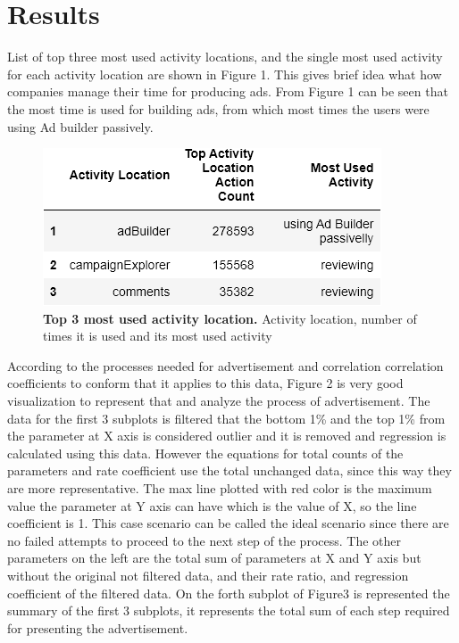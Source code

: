 \documentclass[fleqn,moreauthors,10pt]{ds_report}
\begin{document}

\section*{Results}
\FloatBarrier

List of top three most used activity locations, and the single most used activity for each activity location are shown in Figure 1. This gives brief idea what how companies manage their time for producing ads. From Figure 1 can be seen that the most time is used for building ads, from which most times the users were using Ad builder passively. %
\begin{figure}\centering
	\includegraphics[width=\linewidth]{mostUsedActivityLocTable.png}
	\caption{\textbf{Top 3 most used activity location.} Activity location, number of times it is used and its most used activity}
	\label{fig:column}
\end{figure}
\FloatBarrier
According to the processes needed for advertisement and correlation correlation coefficients to conform that it applies to this data, Figure 2 is very good visualization to represent that and analyze the process of advertisement. The data for the first 3 subplots is filtered that the bottom 1\% and the top 1\%  from the parameter at X axis is considered outlier and it is removed and regression is calculated using this data. However the equations for total counts of the parameters and rate coefficient use the total unchanged data, since this way they are more representative. The max line plotted with red color is the maximum value the parameter at Y axis can have which is the value of X, so the line coefficient is 1. This case scenario can be called the ideal scenario since there are no failed attempts to proceed to the next step of the process. The other parameters on the left are the total sum of parameters at X and Y axis but without the original not filtered data, and their rate ratio, and regression coefficient of the filtered data. On the forth subplot of Figure3 is represented the summary of the first 3 subplots, it represents the total  sum of each step required for presenting the advertisement.
\end{document}
